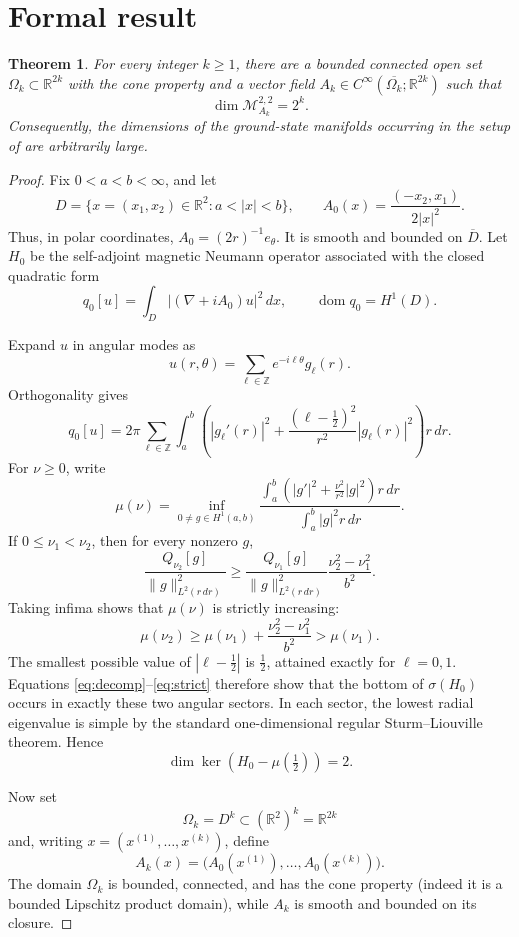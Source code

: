 \documentclass[11pt]{article}
\newtheorem{theorem}{Theorem}
\newcommand{\R}{\mathbb R}
\newcommand{\Z}{\mathbb Z}
\newcommand{\cM}{\mathcal M}
\begin{document}
\section{Formal result}

\begin{theorem}\label{thm:main}
For every integer \(k\geq1\), there are a bounded connected open set
\(\Omega_k\subset\R^{2k}\) with the cone property and a vector field
\(A_k\in C^\infty(\overline{\Omega_k};\R^{2k})\) such that
\[
       \dim \cM_{A_k}^{2,2}=2^k.
\]
Consequently, the dimensions of the ground-state manifolds occurring in the
setup of \cite{LSY} are arbitrarily large.
\end{theorem}

\begin{proof}
Fix \(0<a<b<\infty\), and let
\[
 D=\{x=(x_1,x_2)\in\R^2:a<|x|<b\},\qquad
 A_0(x)=\frac{(-x_2,x_1)}{2|x|^2}.
\]
Thus, in polar coordinates, \(A_0=(2r)^{-1}e_\theta\).  It is smooth
and bounded on \(\overline D\).  Let \(H_0\) be the self-adjoint magnetic
Neumann operator associated with the closed quadratic form
\[
 q_0[u]=\int_D|(\nabla+iA_0)u|^2\,dx,\qquad
 \operatorname{dom}q_0=H^1(D).
\]

Expand \(u\) in angular modes as
\[
             u(r,\theta)=\sum_{\ell\in\Z}e^{-i\ell\theta}g_\ell(r).
\]
Orthogonality gives
\[
 q_0[u]
 =2\pi\sum_{\ell\in\Z}\int_a^b
 \left(|g_\ell'(r)|^2+
 \frac{(\ell-\tfrac12)^2}{r^2}|g_\ell(r)|^2\right)r\,dr.
 \tag{1}\label{eq:decomp}
\]
For \(\nu\geq0\), write
\[
 \mu(\nu)=
 \inf_{0\ne g\in H^1(a,b)}
 \frac{\displaystyle\int_a^b
   \left(|g'|^2+\frac{\nu^2}{r^2}|g|^2\right)r\,dr}
 {\displaystyle\int_a^b |g|^2r\,dr}.
\]
If \(0\leq\nu_1<\nu_2\), then for every nonzero \(g\),
\[
 \frac{Q_{\nu_2}[g]}{\|g\|^2_{L^2(r\,dr)}}
 \geq
 \frac{Q_{\nu_1}[g]}{\|g\|^2_{L^2(r\,dr)}}
 \frac{\nu_2^2-\nu_1^2}{b^2}.
\]
Taking infima shows that \(\mu(\nu)\) is strictly increasing:
\[
 \mu(\nu_2)\geq\mu(\nu_1)+
 \frac{\nu_2^2-\nu_1^2}{b^2}>\mu(\nu_1).
 \tag{2}\label{eq:strict}
\]
The smallest possible value of \(|\ell-\tfrac12|\) is \(\tfrac12\),
attained exactly for \(\ell=0,1\).  Equations
\eqref{eq:decomp}--\eqref{eq:strict} therefore show that the bottom of
\(\sigma(H_0)\) occurs in exactly these two angular sectors.  In each
sector, the lowest radial eigenvalue is simple by the standard
one-dimensional regular Sturm--Liouville theorem.  Hence
\[
                     \dim\ker(H_0-\mu(\tfrac12))=2.
 \tag{3}\label{eq:two}
\]

Now set
\[
 \Omega_k=D^k\subset(\R^2)^k=\R^{2k}
\]
and, writing \(x=(x^{(1)},\ldots,x^{(k)})\), define
\[
 A_k(x)=\bigl(A_0(x^{(1)}),\ldots,A_0(x^{(k)})\bigr).
\]
The domain \(\Omega_k\) is bounded, connected, and has the cone property
(indeed it is a bounded Lipschitz product domain), while \(A_k\) is smooth
and bounded on its closure.


\end{proof}
\end{document}
